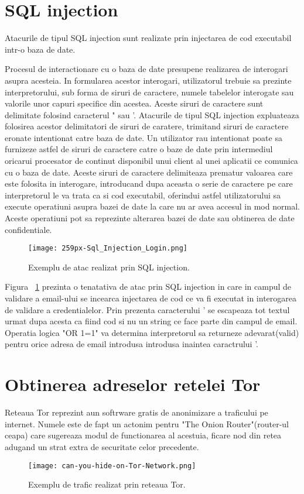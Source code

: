 \section{SQL injection}

Atacurile de tipul SQL injection sunt realizate prin injectarea de cod executabil intr-o baza de date.

Procesul de interactionare cu o baza de date presupene realizarea de interogari asupra acesteia. In formularea acestor interogari, utilizatorul trebuie sa prezinte interpretorului, sub forma de siruri de caractere, numele tabelelor interogate sau valorile unor capuri specifice din acestea. Aceste siruri de caractere sunt delimitate folosind caracterul " sau '. Atacurile de tipul SQL injection expluateaza folosirea acestor delimitatori de siruri de caratere, trimitand siruri de caractere eronate intentionat catre baza de date. Un utilizator rau intentionat poate sa furnizeze astfel de siruri de caractere catre o baze de date prin intermediul oricarui procesator de continut disponibil unui client al unei aplicatii ce comunica cu o baza de date. Aceste siruri de caractere delimiteaza prematur valoarea care este folosita in interogare, introducand dupa aceasta o serie de caractere pe care interpretorul le va trata ca si cod executabil, oferindui astfel utilizatorului sa execute operatiuni asupra bazei de date la care nu ar avea accesul in mod normal. Aceste operatiuni pot sa reprezinte alterarea bazei de date sau obtinerea de date confidentiale. \\



\begin{figure}[h]
	\centering
	\texttt{[image: 259px-Sql\_Injection\_Login.png]}
	\caption{Exemplu de atac realizat prin SQL injection.}
	\label{fig:sqli-example}
\end{figure}

Figura ~\ref{fig:sqli-example} prezinta o tenatativa de atac prin SQL injection in care in campul de validare a email-ului se incearca injectarea de cod ce va fi executat in interogarea de validare a credentialelor. Prin prezenta caracterului ' se escapeaza tot textul urmat dupa acesta ca fiind cod si nu un string ce face parte din campul de email. Operatia logica "OR 1=1" va determina interpretorul sa returneze adevarat(valid) pentru orice adresa de email introdusa introdusa inaintea caractrului '. \\
\section{Obtinerea adreselor retelei Tor}
Reteaua Tor reprezint aun softrware gratis de anonimizare a traficului pe internet. Numele este de fapt un actonim pentru "The Onion Router"(router-ul ceapa) care sugereaza modul de functionarea al acestuia, ficare nod din retea adugand un strat extra de securitate celor precedente. 
\begin{figure}[h]
	\centering
	\texttt{[image: can-you-hide-on-Tor-Network.png]}
	\caption{Exemplu de trafic realizat prin reteaua Tor.}
	\label{fig:tor-example}
\end{figure}

